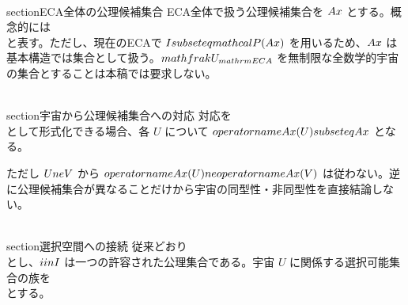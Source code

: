 \documentclass[11pt,a4paper]{article}
\begin{document}
\\section{ECA全体の公理候補集合}
ECA全体で扱う公理候補集合を $\\Ax$ とする。概念的には
\\[
\\boxed{\\Ax=\\bigcup_{U\\in\\mathfrak U_{\\mathrm{ECA}}}\\operatorname{Ax}(U)}
\\]
と表す。ただし、現在のECAで $I\\subseteq\\mathcal P(\\Ax)$ を用いるため、$\\Ax$ は基本構造では集合として扱う。$\\mathfrak U_{\\mathrm{ECA}}$ を無制限な全数学的宇宙の集合とすることは本稿では要求しない。

\\section{宇宙から公理候補集合への対応}
対応を
\\[
\\operatorname{Ax}_{\\mathrm{map}}:\mathfrak U_{\\mathrm{ECA}}\\to\\mathcal P(\\Ax),
\\qquad
\\operatorname{Ax}_{\\mathrm{map}}(U)=\\operatorname{Ax}(U)
\\]
として形式化できる場合、各 $U$ について $\\operatorname{Ax}(U)\\subseteq\\Ax$ となる。

ただし $U\\ne V$ から $\\operatorname{Ax}(U)\\ne\\operatorname{Ax}(V)$ は従わない。逆に公理候補集合が異なることだけから宇宙の同型性・非同型性を直接結論しない。

\\section{選択空間への接続}
従来どおり
\\[
I\\subseteq\\mathcal P(\\Ax)
\\]
とし、$i\\in I$ は一つの許容された公理集合である。宇宙 $U$ に関係する選択可能集合の族を
\\[
I(U)=\\{i\\in I\\mid i\\subseteq\\operatorname{Ax}(U)\\}
\\]
とする。
\end{document}
